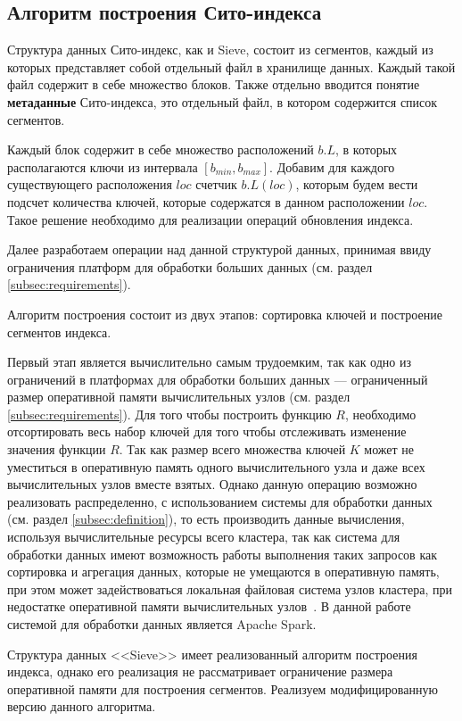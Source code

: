 \subsection{Алгоритм построения Сито-индекса}\label{subsec:build}

Структура данных Сито-индекс, как и Sieve, состоит из сегментов, каждый из которых представляет собой отдельный файл в хранилище данных. Каждый такой файл содержит в себе множество блоков. Также отдельно вводится понятие \textbf{метаданные} Сито-индекса, это отдельный файл, в котором содержится список сегментов.

Каждый блок содержит в себе множество расположений $b.L$, в которых располагаются ключи из интервала $[b_{min}, b_{max}]$. Добавим для каждого существующего расположения $loc$ счетчик $b.L(loc)$, которым будем вести подсчет количества ключей, которые содержатся в данном расположении $loc$. Такое решение необходимо для реализации операций обновления индекса.

Далее разработаем операции над данной структурой данных, принимая ввиду ограничения платформ для обработки больших данных (см. раздел \ref{subsec:requirements}).

Алгоритм построения состоит из двух этапов: сортировка ключей и построение сегментов индекса.

Первый этап является вычислительно самым трудоемким, так как одно из ограничений в платформах для обработки больших данных --- ограниченный размер оперативной памяти вычислительных узлов (см. раздел \ref{subsec:requirements}). Для того чтобы построить функцию $R$, необходимо отсортировать весь набор ключей для того чтобы отслеживать изменение значения функции $R$. Так как размер всего множества ключей $K$ может не уместиться в оперативную память одного вычислительного узла и даже всех вычислительных узлов вместе взятых. Однако данную операцию возможно реализовать распределенно, с использованием системы для обработки данных (см. раздел \ref{subsec:definition}), то есть производить данные вычисления, используя вычислительные ресурсы всего кластера, так как система для обработки данных имеют возможность работы выполнения таких запросов как сортировка и агрегация данных, которые не умещаются в оперативную память, при этом может задействоваться локальная файловая система узлов кластера, при недостатке оперативной памяти вычислительных узлов~\cite{Impact_of_memory_size_on_bigdata}. В данной работе системой для обработки данных является Apache Spark.

Структура данных {<<Sieve>>} имеет реализованный алгоритм построения индекса, однако его реализация не рассматривает ограничение размера оперативной памяти для построения сегментов. Реализуем модифицированную версию данного алгоритма.

